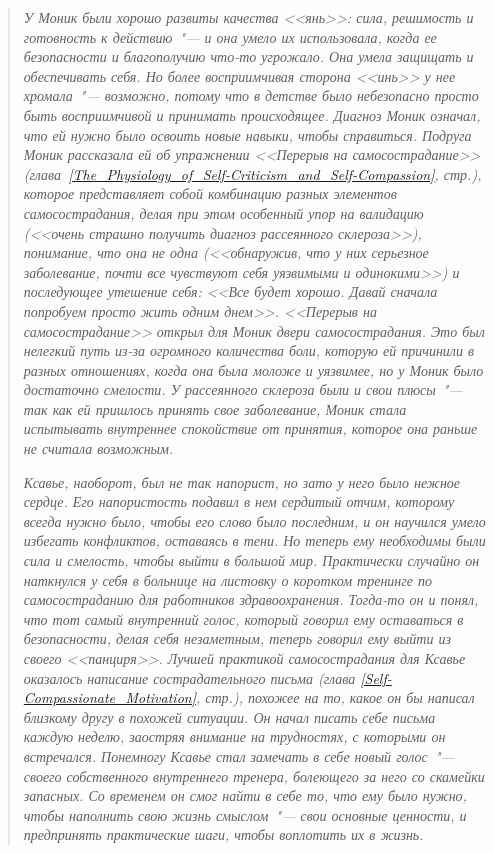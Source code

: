 \begin{quotation}
	\textit{У Моник были хорошо развиты качества <<янь>>: сила, решимость и готовность к действию~"--- и она умело их использовала, когда ее безопасности и благополучию что-то угрожало. Она умела защищать и обеспечивать себя. Но более восприимчивая сторона <<инь>> у нее хромала~"--- возможно, потому что в детстве было небезопасно просто быть восприимчивой и принимать происходящее. Диагноз Моник означал, что ей нужно было освоить новые навыки, чтобы справиться. Подруга Моник рассказала ей об упражнении <<Перерыв на самосострадание>> (глава~\ref{The_Physiology_of_Self-Criticism_and_Self-Compassion}, стр.\:\pageref{IP:Self-Compassion_Break}), которое представляет собой комбинацию разных элементов самосострадания, делая при этом особенный упор на валидацию (<<очень страшно получить диагноз рассеянного склероза>>), понимание, что она не одна (<<обнаружив, что у них серьезное заболевание, почти все чувствуют себя уязвимыми и одинокими>>) и последующее утешение себя: <<Все будет хорошо. Давай сначала попробуем просто жить одним днем>>. <<Перерыв на самосострадание>> открыл для Моник двери самосострадания. Это был нелегкий путь из-за огромного количества боли, которую ей причинили в разных отношениях, когда она была моложе и уязвимее, но у Моник было достаточно смелости. У рассеянного склероза были и свои плюсы~"--- так как ей пришлось принять свое заболевание, Моник стала испытывать внутреннее спокойствие от принятия, которое она раньше не считала возможным.}
		
	\textit{Ксавье, наоборот, был не так напорист, но зато у него было нежное сердце. Его напористость подавил в нем сердитый отчим, которому всегда нужно было, чтобы его слово было последним, и он научился умело избегать конфликтов, оставаясь в тени. Но теперь ему необходимы были сила и смелость, чтобы выйти в большой мир. Практически случайно он наткнулся у себя в больнице на листовку о коротком тренинге по самосостраданию для работников здравоохранения. Тогда-то он и понял, что тот самый внутренний голос, который говорил ему оставаться в безопасности, делая себя незаметным, теперь говорил ему выйти из своего <<панциря>>. Лучшей практикой самосострадания для Ксавье оказалось написание сострадательного письма (глава \ref{Self-Compassionate_Motivation}, стр.\:\pageref{IP:Compassionate_Letter_to_Myself}), похожее на то, какое он бы написал близкому другу в похожей ситуации. Он начал писать себе письма каждую неделю, заостряя внимание на трудностях, с которыми он встречался. Понемногу Ксавье стал замечать в себе новый голос~"--- своего собственного внутреннего тренера, болеющего за него со скамейки запасных. Со временем он смог найти в себе то, что ему было нужно, чтобы наполнить свою жизнь смыслом~"--- свои основные ценности, и предпринять практические шаги, чтобы воплотить их в жизнь.}
\end{quotation}

